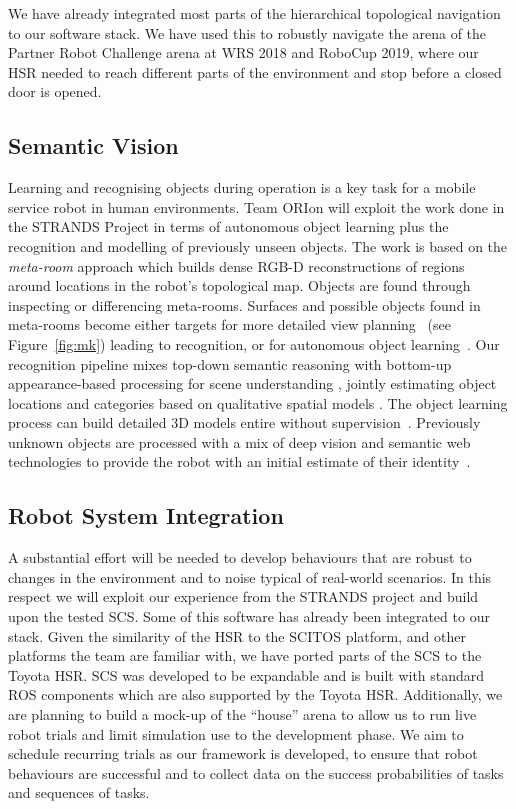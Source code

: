\documentclass[runningheads,a4paper]{llncs}
\newcommand{\teamori}{Team ORIon}
\begin{document}
We have already integrated most parts of the hierarchical topological navigation
to our software stack. We have used this to robustly navigate the arena of
the Partner Robot Challenge arena at WRS 2018 and RoboCup 2019, where our HSR needed to reach
different parts of the environment and stop before a closed
door is opened. 

\subsection{Semantic Vision}

Learning and recognising objects during operation is a key task for a mobile service robot in human environments. \teamori{} will exploit the work done in the STRANDS Project in terms of autonomous object learning plus the recognition and modelling of previously unseen objects. The work is based on the \emph{meta-room} approach which builds dense RGB-D reconstructions of regions around locations in the robot's topological map. Objects are found through inspecting or differencing meta-rooms. Surfaces and possible objects found in meta-rooms become either targets for more detailed view planning~\cite{kunze14indirect} (see Figure~\ref{fig:mk}) leading to recognition, or for autonomous object learning~\cite{Faeulhammer:2016}. Our recognition pipeline mixes top-down semantic reasoning with bottom-up appearance-based processing for scene understanding \cite{kunze14topdown}, jointly estimating object locations and categories based on qualitative spatial models \cite{kunze14bootstrapping}. The object learning process can build detailed 3D models entire without supervision~\cite{Faeulhammer:2016}. Previously unknown  objects are processed with a mix of deep vision and semantic web technologies to provide the robot with an initial estimate of their identity~\cite{aloof@icra17}.



\subsection{Robot System Integration}

A substantial effort will be needed to develop behaviours that are robust to
changes in the environment and to noise typical of real-world scenarios. In this
respect we will exploit our experience from the STRANDS project 
\cite{strands@ram} and build upon the tested SCS. Some of this software has already been integrated to our stack.
Given the similarity of the HSR to the SCITOS platform, and other platforms the team are familiar with, %
we have ported parts of the
SCS to the Toyota HSR. SCS was developed to be 
expandable and is built with standard ROS components which are also supported 
by the Toyota HSR. 
Additionally, we are planning to build a mock-up of the ``house'' arena to
allow us to run live robot trials and limit simulation use to the development
phase. We aim to schedule recurring trials as our framework is developed, to
ensure that robot behaviours are successful and to collect data on the 
success probabilities of tasks and sequences of tasks.
\end{document}
